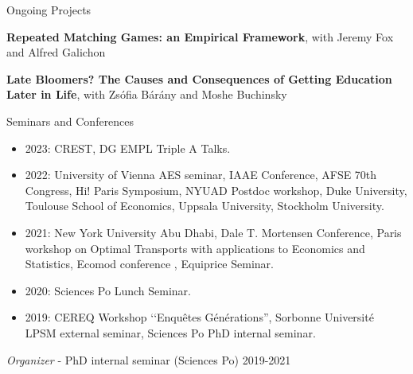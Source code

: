 \documentclass{resume} %
\begin{document}
\begin{rSection}{Ongoing Projects}

{\bf Repeated Matching Games: an Empirical Framework}, with Jeremy Fox and Alfred Galichon

{\bf Late Bloomers? The Causes and Consequences of Getting Education Later in Life}, with Zsófia Bárány and Moshe Buchinsky

\end{rSection}


\begin{rSection}{Seminars and Conferences}
\begin{itemize}
  \item 2023: CREST, DG EMPL Triple A Talks.
  \item 2022: University of Vienna AES seminar, IAAE Conference, AFSE 70th Congress, Hi! Paris Symposium, NYUAD Postdoc workshop, Duke University, Toulouse School of Economics, Uppsala University, Stockholm University.
  \item 2021: New York University Abu Dhabi, Dale T. Mortensen Conference, Paris workshop on Optimal Transports with applications to Economics and Statistics, Ecomod conference , Equiprice Seminar.
  \item 2020: Sciences Po Lunch Seminar.
  \item 2019: CEREQ Workshop ‘‘Enquêtes Générations'', Sorbonne Université LPSM external seminar, Sciences Po PhD internal seminar.
\end{itemize}

{\em Organizer} - PhD internal seminar (Sciences Po) \hfill {2019-2021}

\end{rSection}
\end{document}
